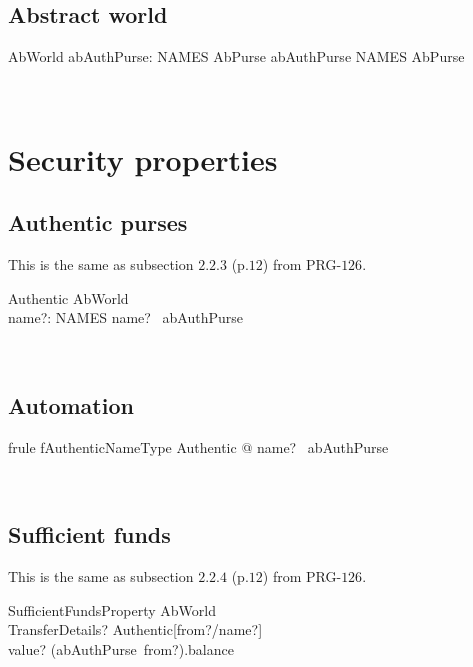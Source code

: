 \subsection{Abstract world}

\begin{LSDef}
\begin{schema}{AbWorld}
  abAuthPurse: NAMES \pfun  AbPurse
\where
  abAuthPurse \in  NAMES \ffun  AbPurse
\end{schema}~\end{LSDef}

\section{Security properties}\label{ch3.security}

\subsection{Authentic purses}

This is the same as subsection $2.2.3$ (p.$12$) from PRG-$126$.
\begin{LSDef}
\begin{schema}{Authentic}
  AbWorld\\
  name?: NAMES
\where
  name? \in \dom~abAuthPurse
\end{schema}~\end{LSDef}

\subsection*{Automation}

\begin{LFRT}
\begin{theorem}{frule fAuthenticNameType}
  \forall  Authentic @ name? \in  \dom~abAuthPurse
\end{theorem}~\end{LFRT}

\subsection{Sufficient funds}

This is the same as subsection $2.2.4$ (p.$12$) from PRG-$126$.
\begin{LSDef}
\begin{schema}{SufficientFundsProperty}
  AbWorld\\
  TransferDetails?
\where
  Authentic[from?/name?]\\
  value? \leq  (abAuthPurse~from?).balance
\end{schema}~\end{LSDef}

